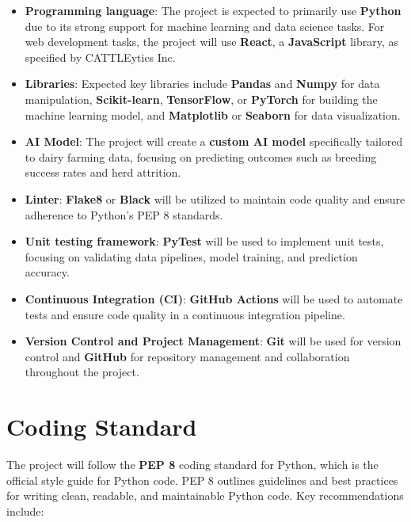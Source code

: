 \documentclass{article}
\begin{document}
\begin{itemize}
    \item \textbf{Programming language}: 
    The project is expected to primarily use \textbf{Python} due to its strong support for machine learning and data science tasks. For web development tasks, the project will use \textbf{React}, a \textbf{JavaScript} library, as specified by CATTLEytics Inc. 
    \item \textbf{Libraries}: 
    Expected key libraries include \textbf{Pandas} and \textbf{Numpy} for data manipulation, \textbf{Scikit-learn}, \textbf{TensorFlow}, or \textbf{PyTorch} for building the machine learning model, and \textbf{Matplotlib} or \textbf{Seaborn} for data visualization.
    \item \textbf{AI Model}: 
    The project will create a \textbf{custom AI model} specifically tailored to dairy farming data, focusing on predicting outcomes such as breeding success rates and herd attrition.
    \item \textbf{Linter}: 
    \textbf{Flake8} or \textbf{Black} will be utilized to maintain code quality and ensure adherence to Python's PEP 8 standards.
    \item \textbf{Unit testing framework}: 
    \textbf{PyTest} will be used to implement unit tests, focusing on validating data pipelines, model training, and prediction accuracy.
    \item \textbf{Continuous Integration (CI)}: 
    \textbf{GitHub Actions} will be used to automate tests and ensure code quality in a continuous integration pipeline.
    \item \textbf{Version Control and Project Management}: 
    \textbf{Git} will be used for version control and \textbf{GitHub} for repository management and collaboration throughout the project.
\end{itemize}

\section{Coding Standard}

The project will follow the \textbf{PEP 8} coding standard for Python, which is the official style guide for Python code. PEP 8 outlines guidelines and best practices for writing clean, readable, and maintainable Python code. Key recommendations include:
\end{document}
